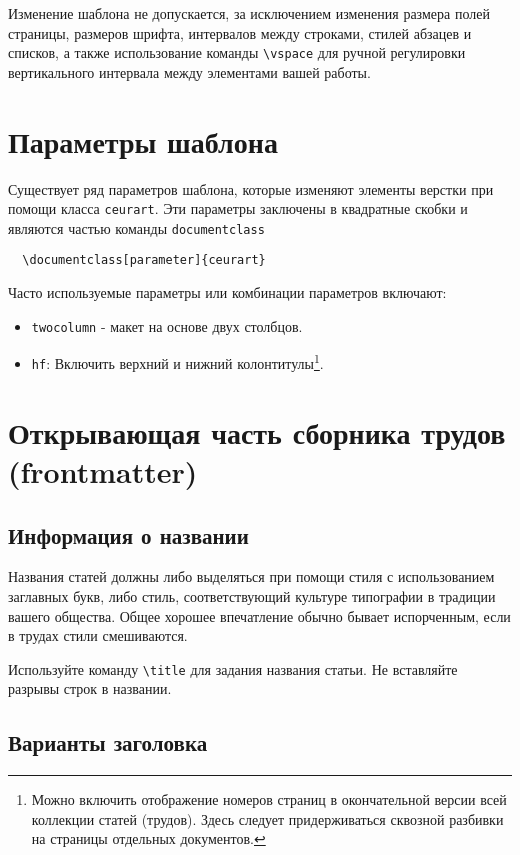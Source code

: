 \documentclass[
12pt,
babel,       %
firacode,    %
wordmath,      %
russian        %
]{isdctart}
\begin{document}
Изменение шаблона не допускается, за исключением изменения размера полей страницы, размеров шрифта, интервалов между строками, стилей абзацев и списков, а также использование команды \verb|\vspace| для ручной регулировки вертикального интервала между элементами вашей работы.

\section{Параметры шаблона}

Существует ряд параметров шаблона, которые изменяют элементы верстки при помощи класса \verb|ceurart|. Эти параметры заключены в квадратные скобки и являются частью команды {\verb|documentclass|}
\begin{verbatim}
  \documentclass[parameter]{ceurart}
\end{verbatim}

Часто используемые параметры или комбинации параметров включают:
\begin{itemize}
\item {\verb|twocolumn|} - макет на основе двух столбцов.
\item {\verb|hf|}: Включить верхний и нижний колонтитулы\footnote{Можно включить отображение номеров страниц в окончательной версии всей коллекции статей (трудов). Здесь следует придерживаться сквозной разбивки на страницы отдельных документов.}.
\end{itemize}

\section{Открывающая часть сборника трудов (frontmatter)}

\subsection{Информация о названии}

Названия статей должны либо выделяться при помощи стиля с использованием заглавных букв, либо стиль, соответствующий культуре типографии в традиции вашего общества. Общее хорошее впечатление обычно бывает испорченным, если в трудах стили смешиваются.

Используйте команду \verb|\title| для задания названия статьи. Не вставляйте разрывы строк в названии.

\subsection{Варианты заголовка}
\end{document}
